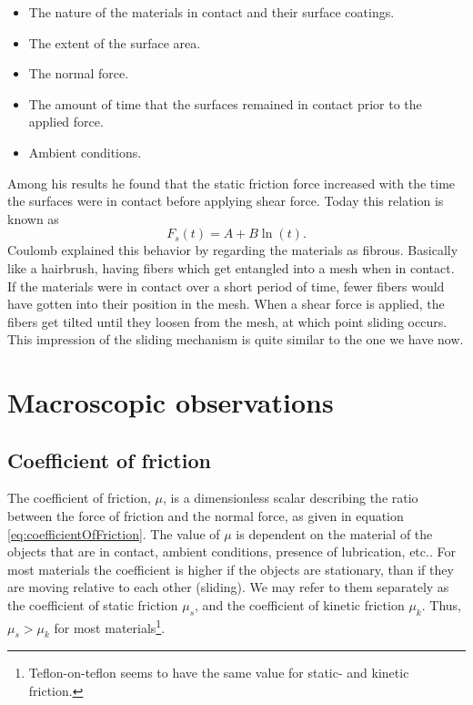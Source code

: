 \documentclass[twoside,english]{uiofysmaster}
\begin{document}
\begin{itemize}
	\item The nature of the materials in contact and their surface coatings.
	\item The extent of the surface area.
	\item The normal force.
	\item The amount of time that the surfaces remained in contact prior to the applied force.
	\item Ambient conditions.
\end{itemize}   
Among his results he found that the static friction force increased with the time the surfaces were in contact before applying shear force. 
Today this relation is known as
\begin{equation}
	F_s(t) = A+B\ln(t).
\end{equation}
Coulomb explained this behavior by regarding the materials as fibrous. 
Basically like a hairbrush, having fibers which get entangled into a mesh when in contact. 
If the materials were in contact over a short period of time, fewer fibers would have gotten into their position in the mesh. 
When a shear force is applied, the fibers get tilted until they loosen from the mesh, at which point sliding occurs. 
This impression of the sliding mechanism is quite similar to the one we have now. 




\section{Macroscopic observations}




\subsection{Coefficient of friction}\label{sec:coefficientOfFriction}
The coefficient of friction, $\mu$, is a dimensionless scalar describing the ratio between the force of friction and the normal force, as given in equation \eqref{eq:coefficientOfFriction}.
The value of $\mu$ is dependent on the material of the objects that are in contact, ambient conditions, presence of lubrication, etc.. 
For most materials the coefficient is higher if the objects are stationary, than if they are moving relative to each other (sliding).
We may refer to them separately as the coefficient of static friction $\mu_s$, and the coefficient of kinetic friction $\mu_k$.
Thus, $\mu_s>\mu_ k$ for most materials\footnote{Teflon-on-teflon seems to have the same value for static- and kinetic friction.}.
\end{document}
